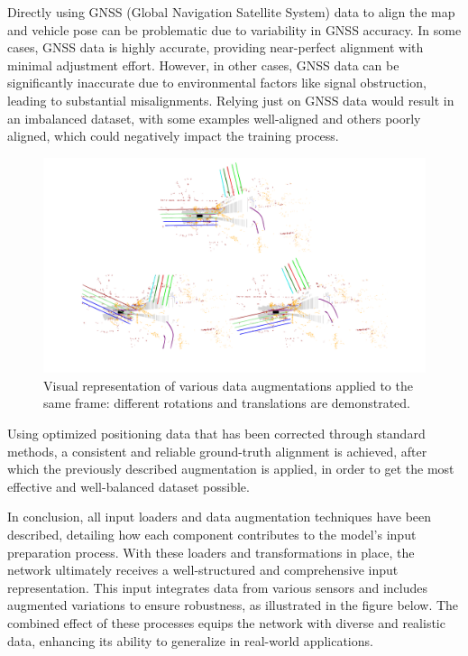Directly using GNSS (Global Navigation Satellite System) data to align the map and vehicle pose can be problematic due to variability in GNSS accuracy. In some cases, GNSS data is highly accurate, providing near-perfect alignment with minimal adjustment effort. However, in other cases, GNSS data can be significantly inaccurate due to environmental factors like signal obstruction, leading to substantial misalignments. Relying just on GNSS data would result in an imbalanced dataset, with some examples well-aligned and others poorly aligned, which could negatively impact the training process.
\begin{figure}[H]
    \centering
    \includegraphics[width=1\linewidth]{LateX//figs/data_augmentation_zoom.pdf}
    \caption{Visual representation of various data augmentations applied to the same frame: different rotations and translations are demonstrated.}
    \label{fig:data_augmentation_maps}
\end{figure}
Using optimized positioning data that has been corrected through standard methods, a consistent and reliable ground-truth alignment is achieved, after which the previously described augmentation is applied, in order to get the most effective and well-balanced dataset possible.

In conclusion, all input loaders and data augmentation techniques have been described, detailing how each component contributes to the model's input preparation process. With these loaders and transformations in place, the network ultimately receives a well-structured and comprehensive input representation. This input integrates data from various sensors and includes augmented variations to ensure robustness, as illustrated in the figure below. The combined effect of these processes equips the network with diverse and realistic data, enhancing its ability to generalize in real-world applications.

